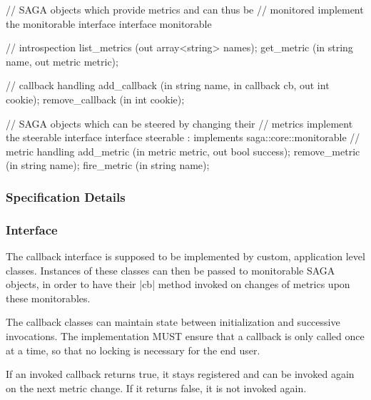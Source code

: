 \begin{myspec}
{ 
    // SAGA objects which provide metrics and can thus be
    // monitored implement the monitorable interface
    interface monitorable
    {
      // introspection
      list_metrics       (out array<string>   names);
      get_metric         (in  string          name,
                          out metric          metric);
 
      // callback handling
      add_callback       (in  string          name,
                          in  callback        cb,
                          out int             cookie);
      remove_callback    (in  int             cookie);
    }
 
 
    // SAGA objects which can be steered by changing their
    // metrics implement the steerable interface
    interface steerable : implements saga::core::monitorable
    {
      // metric handling
      add_metric         (in  metric          metric,
                          out bool            success);
      remove_metric      (in  string          name);
      fire_metric        (in  string          name);
    }
  }
 \end{myspec}
 
 
 \subsubsection{Specification Details}
 
  \upp
  \subsubsection*{Interface }
 
    \upp
    The callback interface is supposed to be implemented by
    custom, application level classes.  Instances of these
    classes can then be passed to monitorable SAGA
    objects, in order to have their |cb| method invoked on changes
    of metrics upon these monitorables.
 
    The callback classes can maintain state between
    initialization and successive invocations.  The
    implementation MUST ensure that a callback is only called
    once at a time, so that no locking is necessary for the end
    user.

 
    If an invoked callback returns true, it stays registered and
    can be invoked again on the next metric change.  If it
    returns false, it is not invoked again.
 
